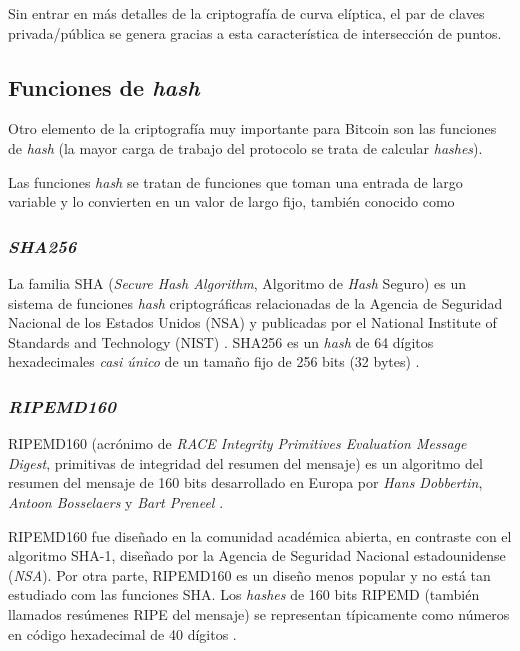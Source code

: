 Sin entrar en más detalles de la criptografía de curva elíptica, el par de claves privada/pública se genera gracias a esta característica de intersección de puntos.

\subsection{Funciones de \emph{hash}}

Otro elemento de la criptografía muy importante para Bitcoin son las funciones de \emph{hash} (la mayor carga de trabajo del protocolo se trata de calcular \emph{hashes}).

Las funciones \emph{hash} se tratan de funciones que toman una entrada de largo variable y lo convierten en un valor de largo fijo, también conocido como  \autocite{VanhouvtenHashIntro} 

\subsubsection{\emph{SHA256}}

La familia SHA (\emph{Secure Hash Algorithm}, Algoritmo de \emph{Hash} Seguro) es un sistema de funciones \emph{hash} criptográficas relacionadas de la Agencia de Seguridad Nacional de los Estados Unidos (NSA) y publicadas por el National Institute of Standards and Technology (NIST) \autocite{WikipediaSHA}. SHA256 es un \emph{hash} de 64 dígitos hexadecimales \emph{casi único} de un tamaño fijo de 256 bits (32 bytes) \autocite{OroYFinanzasSHA}. 

\subsubsection{\emph{RIPEMD160}}

RIPEMD160 (acrónimo de \emph{RACE Integrity Primitives Evaluation Message Digest}, primitivas de integridad del resumen del mensaje) es un algoritmo del resumen del mensaje de 160 bits desarrollado en Europa por \emph{Hans Dobbertin}, \emph{Antoon Bosselaers} y \emph{Bart Preneel} \autocite{WikipediaRIPEMD160}.

RIPEMD160 fue diseñado en la comunidad académica abierta, en contraste con el algoritmo SHA-1, diseñado por la Agencia de Seguridad Nacional estadounidense (\emph{NSA}). Por otra parte, RIPEMD160 es un diseño menos popular y no está tan estudiado com las funciones SHA. Los \emph{hashes} de 160 bits RIPEMD (también llamados resúmenes RIPE del mensaje) se representan típicamente como números en código hexadecimal de 40 dígitos \autocite{OroYFinanzasRIPEMD160}.

